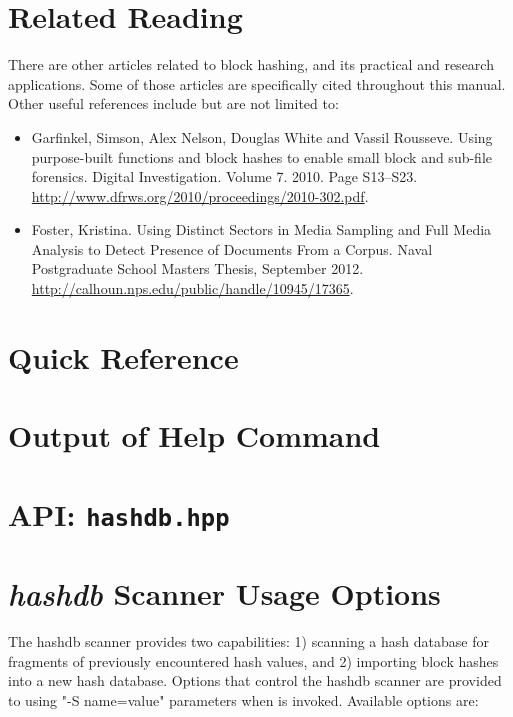 \documentclass[11pt,fleqn]{article} %
\begin{document}
\section{Related Reading}
There are other articles related to block hashing, and its practical and research applications. Some of those articles are specifically cited throughout this manual. Other useful references include but are not limited to:
\begin{itemize}
\item Garfinkel, Simson, Alex Nelson, Douglas White and Vassil Rousseve. Using purpose-built functions and block hashes to enable small block and sub-file forensics. Digital Investigation. Volume 7. 2010. Page S13--S23. \url{http://www.dfrws.org/2010/proceedings/2010-302.pdf}.
\item Foster, Kristina. Using Distinct Sectors in Media Sampling and Full Media Analysis to Detect Presence of Documents From a Corpus. Naval Postgraduate School Masters Thesis, September 2012. \url{http://calhoun.nps.edu/public/handle/10945/17365}.
\end{itemize}

 


\newpage
\appendix
\appendixpage

\section{\hash Quick Reference}
\label{QuickReference}

\newpage

\section{Output of \hash Help Command}
\label{HelpOutput}
\begingroup
\footnotesize
{
\selectfont

}
\endgroup


\section{\hash API: \texttt{hashdb.hpp}}
\label{hashdbapi}
\lstset{language=C++}
\lstset{basicstyle=\footnotesize}
\lstset{breaklines=true}
\lstset{breakatwhitespace=true}



\section{\bulk \textit{hashdb} Scanner Usage Options}
\label{scannerOptionsAppendix}
The \bulk hashdb scanner provides two capabilities: 1) scanning
a hash database for fragments of previously encountered hash values,
and 2) importing block hashes into a new hash database.
Options that control the hashdb
scanner are provided to \bulk using "-S name=value" parameters
when \bulk is invoked.  Available options are: 

\begingroup
\footnotesize
{
\selectfont

}
\endgroup
\end{document}
